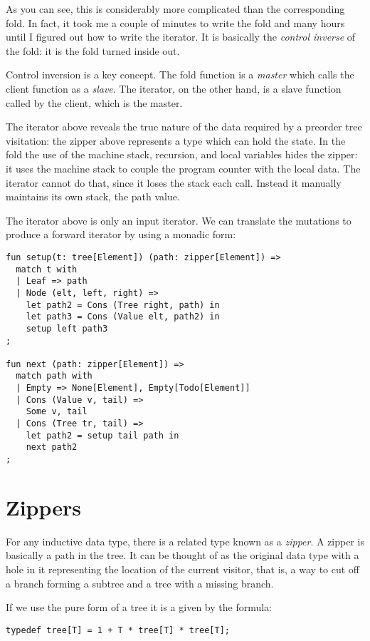 \documentclass[oneside]{book}
\begin{document}
As you can see, this is considerably more complicated than the corresponding fold.
In fact, it took me a couple of minutes to write the fold and many hours
until I figured out how to write the iterator. It is basically the
{\em control inverse} of the fold: it is the fold turned inside out.

Control inversion is a key concept. The fold function is a {\em master} which
calls the client function as a {\em slave}. The iterator, on the other hand,
is a slave function called by the client, which is the master.

The iterator above reveals the true nature of the data required by a preorder
tree visitation: the zipper above represents a type which can hold the state.
In the fold the use of the machine stack, recursion, and local variables
hides the zipper: it uses the machine stack to couple the program counter with
the local data. The iterator cannot do that, since it loses the stack each
call. Instead it manually maintains its own stack, the path value.

The iterator above is only an input iterator. We can translate the mutations
to produce a forward iterator by using a monadic form:

\begin{verbatim}
fun setup(t: tree[Element]) (path: zipper[Element]) =>
  match t with
  | Leaf => path
  | Node (elt, left, right) => 
    let path2 = Cons (Tree right, path) in
    let path3 = Cons (Value elt, path2) in
    setup left path3
;

fun next (path: zipper[Element]) =>
  match path with
  | Empty => None[Element], Empty[Todo[Element]]
  | Cons (Value v, tail) =>
    Some v, tail
  | Cons (Tree tr, tail) =>
    let path2 = setup tail path in
    next path2
;
\end{verbatim}

\section{Zippers}
For any inductive data type, there is a related type known as a {\em zipper}.
A zipper is basically a path in the tree. It can be thought of as the
original data type with a hole in it representing the location of
the current visitor, that is, a way to cut off a branch forming a subtree
and a tree with a missing branch.

If we use the pure form of a tree it is a given by the formula:

\begin{verbatim}
typedef tree[T] = 1 + T * tree[T] * tree[T];
\end{verbatim}
\end{document}
